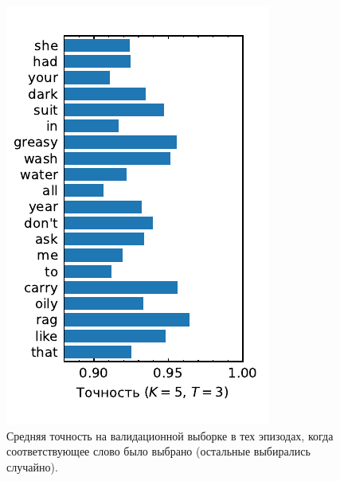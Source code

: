 \begin{figure}[!h]
    \centering
    \includegraphics[scale=\pltscale]{../plots/word_scores.pdf}
    \caption{Средняя точность \guesser{} на валидационной выборке в тех
    эпизодах, когда соответствующее слово было выбрано (остальные выбирались
    случайно).}
    \label{fig:wscores}
\end{figure}

